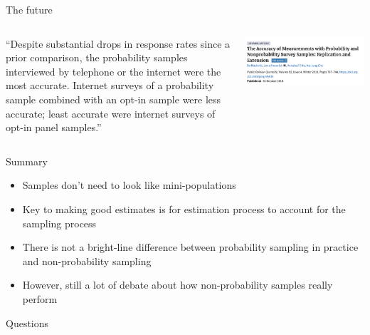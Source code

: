 \documentclass[aspectratio=169]{beamer}
\begin{document}
\begin{frame}{The future}

\begin{columns}[T]

\begin{column}{0.39\textwidth}
\vspace{1.5em}
``Despite substantial drops in response rates since a prior comparison, the probability samples interviewed by telephone or the internet were the most accurate. Internet surveys of a probability sample combined with an opt-in sample were less accurate; least accurate were internet surveys of opt-in panel samples.'' \\
\vspace{1.5em}
\end{column}

\begin{column}{0.59\textwidth}
\begin{center}
\includegraphics[width=\textwidth]{figures/maciniss-et-al-abstract.png}
\end{center}
\end{column}

\end{columns}

\end{frame}
\begin{frame}{Summary}

\begin{itemize}
\item Samples don't need to look like mini-populations
\pause
\item Key to making good estimates is for estimation process to account for the sampling process
\pause
\item There is not a bright-line difference between probability sampling in practice and non-probability sampling
\pause
\item However, still a lot of debate about how non-probability samples really perform
\end{itemize}

\end{frame}
\begin{frame}

\begin{center}
\Large Questions
\end{center}

\end{frame}
\end{document}
